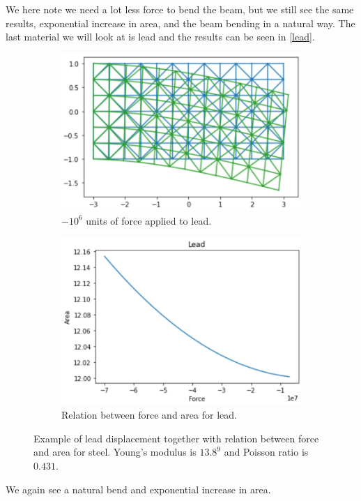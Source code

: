 We here note we need a lot less force to bend the beam, but we still see the same results, exponential increase in area, and the beam bending in a natural way. The last material we will look at is lead and the results can be seen in \autoref{lead}.
\begin{figure}[H]
	\centering
	\begin{subfigure}[b]{0.49\linewidth}
		\centering
		\includegraphics[width=\linewidth]{Materials/Leadviz}
		\caption{$-10^6$ units of force applied to lead.\\\hfill}
	\end{subfigure}
	\hfill
	\begin{subfigure}[b]{0.49\linewidth}
		\centering
		\includegraphics[width=\linewidth]{Materials/LeadArea}
		\caption{Relation between force and area for lead.}
	\end{subfigure}
	\caption{Example of lead displacement together with relation between force and area for steel. Young's modulus is $13.8^9$ and Poisson ratio is $0.431$.}
	\label{lead}
\end{figure}
We again see a natural bend and exponential increase in area.

